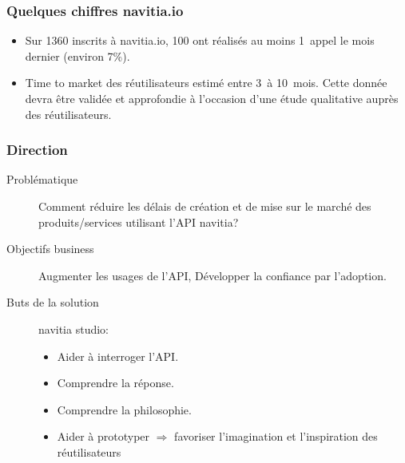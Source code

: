\documentclass[table]{beamer}
\begin{document}

\begin{frame}
  \frametitle{Quelques chiffres navitia.io}

  \begin{itemize}
  \item Sur 1360 inscrits à navitia.io, 100 ont réalisés au moins
    1~appel le mois dernier (environ 7\%).
  \item Time to market des réutilisateurs estimé entre 3~à 10~mois.
    Cette donnée devra être validée et approfondie à l'occasion d'une
    étude qualitative auprès des réutilisateurs.
  \end{itemize}
\end{frame}

\begin{frame}
  \frametitle{Direction}

  \begin{description}
  \item[Problématique] Comment réduire les délais de création et de
    mise sur le marché des produits/services utilisant l'API navitia?
  \item[Objectifs business] Augmenter les usages de l'API, Développer
    la confiance par l'adoption.
  \item[Buts de la solution] navitia studio:
    \begin{itemize}
    \item Aider à interroger l'API.
    \item Comprendre la réponse.
    \item Comprendre la philosophie.
    \item Aider à prototyper $\Rightarrow$ favoriser l'imagination et
      l'inspiration des réutilisateurs
    \end{itemize}
  \end{description}
\end{frame}

\end{document}
